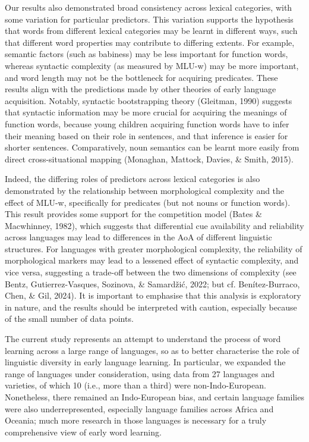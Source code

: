 \documentclass[10pt, letterpaper]{article}
\begin{document}
Our results also demonstrated broad consistency across lexical
categories, with some variation for particular predictors. This
variation supports the hypothesis that words from different lexical
categories may be learnt in different ways, such that different word
properties may contribute to differing extents. For example, semantic
factors (such as babiness) may be less important for function words,
whereas syntactic complexity (as measured by MLU-w) may be more
important, and word length may not be the bottleneck for acquiring
predicates. These results align with the predictions made by other
theories of early language acquisition. Notably, syntactic bootstrapping
theory (Gleitman, 1990) suggests that syntactic information may be more
crucial for acquiring the meanings of function words, because young
children acquiring function words have to infer their meaning based on
their role in sentences, and that inference is easier for shorter
sentences. Comparatively, noun semantics can be learnt more easily from
direct cross-situational mapping (Monaghan, Mattock, Davies, \& Smith,
2015).

Indeed, the differing roles of predictors across lexical categories is
also demonstrated by the relationship between morphological complexity
and the effect of MLU-w, specifically for predicates (but not nouns or
function words). This result provides some support for the competition
model (Bates \& Macwhinney, 1982), which suggests that differential cue
availability and reliability across languages may lead to differences in
the AoA of different linguistic structures. For languages with greater
morphological complexity, the reliability of morphological markers may
lead to a lessened effect of syntactic complexity, and vice versa,
suggesting a trade-off between the two dimensions of complexity (see
Bentz, Gutierrez-Vasques, Sozinova, \& Samardžić, 2022; but cf.
Benítez-Burraco, Chen, \& Gil, 2024). It is important to emphasise that
this analysis is exploratory in nature, and the results should be
interpreted with caution, especially because of the small number of data
points.

The current study represents an attempt to understand the process of
word learning across a large range of languages, so as to better
characterise the role of linguistic diversity in early language
learning. In particular, we expanded the range of languages under
consideration, using data from 27 languages and varieties, of which 10
(i.e., more than a third) were non-Indo-European. Nonetheless, there
remained an Indo-European bias, and certain language families were also
underrepresented, especially language families across Africa and
Oceania; much more research in those languages is necessary for a truly
comprehensive view of early word learning.
\end{document}
